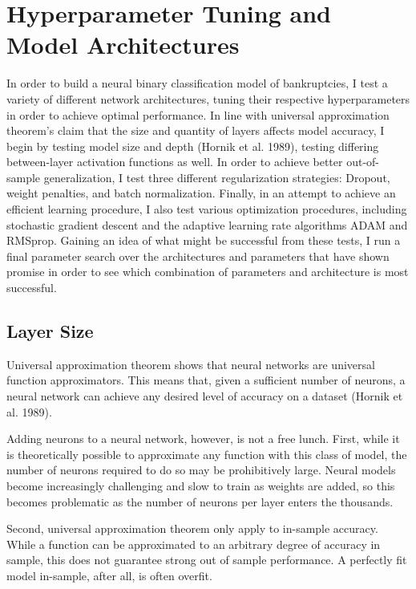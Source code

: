 \documentclass[12pt]{article}  %
\theoremstyle{definition}
\theoremstyle{remark}
\begin{document}
\section{Hyperparameter Tuning and Model Architectures}
\par In order to build a neural binary classification model of bankruptcies, I test a variety of different network architectures, tuning their respective hyperparameters in order to achieve optimal performance. In line with universal approximation theorem's claim that the size and quantity of layers affects model accuracy, I begin by testing model size and depth (Hornik et al. 1989), testing differing between-layer activation functions as well. In order to achieve better out-of-sample generalization, I test three different regularization strategies: Dropout, weight penalties, and batch normalization. Finally, in an attempt to achieve an efficient learning procedure, I also test various optimization procedures, including stochastic gradient descent and the adaptive learning rate algorithms ADAM and RMSprop. Gaining an idea of what might be successful from these tests, I run a final parameter search over the architectures and parameters that have shown promise in order to see which  combination of parameters and architecture is most successful. 

\subsection{Layer Size}
\par Universal approximation theorem shows that neural networks are universal function approximators. This means that, given a sufficient number of neurons, a neural network can achieve any desired level of accuracy on a dataset (Hornik et al. 1989). 

\par Adding neurons to a neural network, however, is not a free lunch. First, while it is theoretically possible to approximate any function with this class of model, the number of neurons required to do so may be prohibitively large. Neural models become increasingly challenging and slow to train as weights are added, so this becomes problematic as the number of neurons per layer enters the thousands. 

\par Second, universal approximation theorem only apply to in-sample accuracy. While a function can be approximated to an arbitrary degree of accuracy in sample, this does not guarantee strong out of sample performance. A perfectly fit model in-sample, after all, is often overfit. 
\end{document}
